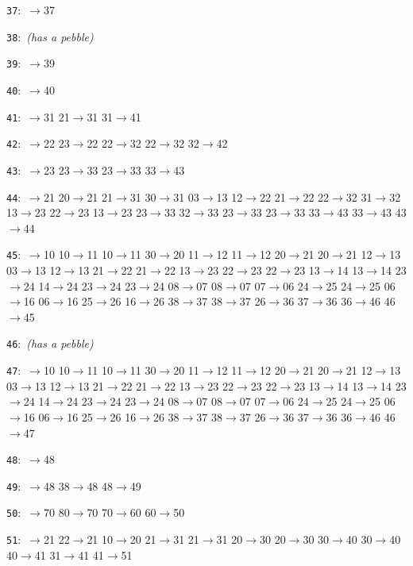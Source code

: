 \documentclass[11pt]{amsart}
\begin{document}
\begin{flushleft}
\noindent\texttt{37}:\ {\footnotesize{}$\to$37}\par
\noindent\texttt{38}:\ {\footnotesize\ttfamily \textrm{\itshape (has a pebble)}}\par
\noindent\texttt{39}:\ {\footnotesize{}$\to$39}\par
\noindent\texttt{40}:\ {\footnotesize{}$\to$40}\par
\noindent\texttt{41}:\ {\footnotesize{}$\to$31 21$\to$31 31$\to$41}\par
\noindent\texttt{42}:\ {\footnotesize{}$\to$22 23$\to$22 22$\to$32 22$\to$32 32$\to$42}\par
\noindent\texttt{43}:\ {\footnotesize{}$\to$23 23$\to$33 23$\to$33 33$\to$43}\par
\noindent\texttt{44}:\ {\footnotesize{}$\to$21 20$\to$21 21$\to$31 30$\to$31 03$\to$13 12$\to$22 21$\to$22 22$\to$32 31$\to$32 13$\to$23 22$\to$23 13$\to$23 23$\to$33 32$\to$33 23$\to$33 23$\to$33 33$\to$43 33$\to$43 43$\to$44}\par
\noindent\texttt{45}:\ {\footnotesize{}$\to$10 10$\to$11 10$\to$11 30$\to$20 11$\to$12 11$\to$12 20$\to$21 20$\to$21 12$\to$13 03$\to$13 12$\to$13 21$\to$22 21$\to$22 13$\to$23 22$\to$23 22$\to$23 13$\to$14 13$\to$14 23$\to$24 14$\to$24 23$\to$24 23$\to$24 08$\to$07 08$\to$07 07$\to$06 24$\to$25 24$\to$25 06$\to$16 06$\to$16 25$\to$26 16$\to$26 38$\to$37 38$\to$37 26$\to$36 37$\to$36 36$\to$46 46$\to$45}\par
\noindent\texttt{46}:\ {\footnotesize\ttfamily \textrm{\itshape (has a pebble)}}\par
\noindent\texttt{47}:\ {\footnotesize{}$\to$10 10$\to$11 10$\to$11 30$\to$20 11$\to$12 11$\to$12 20$\to$21 20$\to$21 12$\to$13 03$\to$13 12$\to$13 21$\to$22 21$\to$22 13$\to$23 22$\to$23 22$\to$23 13$\to$14 13$\to$14 23$\to$24 14$\to$24 23$\to$24 23$\to$24 08$\to$07 08$\to$07 07$\to$06 24$\to$25 24$\to$25 06$\to$16 06$\to$16 25$\to$26 16$\to$26 38$\to$37 38$\to$37 26$\to$36 37$\to$36 36$\to$46 46$\to$47}\par
\noindent\texttt{48}:\ {\footnotesize{}$\to$48}\par
\noindent\texttt{49}:\ {\footnotesize{}$\to$48 38$\to$48 48$\to$49}\par
\noindent\texttt{50}:\ {\footnotesize{}$\to$70 80$\to$70 70$\to$60 60$\to$50}\par
\noindent\texttt{51}:\ {\footnotesize{}$\to$21 22$\to$21 10$\to$20 21$\to$31 21$\to$31 20$\to$30 20$\to$30 30$\to$40 30$\to$40 40$\to$41 31$\to$41 41$\to$51}\par

\end{flushleft}
\end{document}
